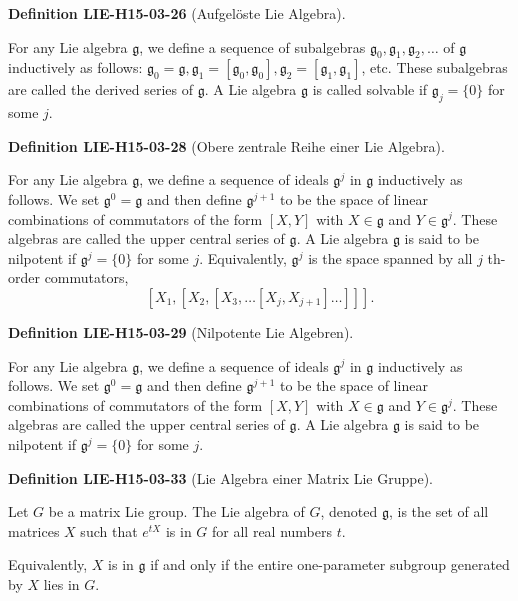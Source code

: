 \documentclass[10pt, letterpaper]{article}
\newcommand{\CustomHeading}[3]{%
  \par\medskip\noindent%
  \textbf{#1 #2} \textnormal{(#3)}.\enskip%
}
\newenvironment{DEF}[2]{\CustomHeading{Definition}{#1}{#2}}{}
\begin{document}
\begin{DEF}{LIE-H15-03-26}{Aufgelöste Lie Algebra}
For any Lie algebra $\mathfrak{g}$, we define a sequence of subalgebras $\mathfrak{g}_{0}, \mathfrak{g}_{1}, \mathfrak{g}_{2}, \ldots$ of $\mathfrak{g}$ inductively as follows: $\mathfrak{g}_{0}=\mathfrak{g}, \mathfrak{g}_{1}=\left[\mathfrak{g}_{0}, \mathfrak{g}_{0}\right], \mathfrak{g}_{2}=\left[\mathfrak{g}_{1}, \mathfrak{g}_{1}\right]$, etc. These subalgebras are called the derived series of $\mathfrak{g}$. A Lie algebra $\mathfrak{g}$ is called solvable if $\mathfrak{g}_{j}=\{0\}$ for some $j$.
\end{DEF}

\begin{DEF}{LIE-H15-03-28}{Obere zentrale Reihe einer Lie Algebra}
For any Lie algebra $\mathfrak{g}$, we define a sequence of ideals $\mathfrak{g}^{j}$ in $\mathfrak{g}$ inductively as follows. We set $\mathfrak{g}^{0}=\mathfrak{g}$ and then define $\mathfrak{g}^{j+1}$ to be the space of linear combinations of commutators of the form $[X, Y]$ with $X \in \mathfrak{g}$ and $Y \in \mathfrak{g}^{j}$. These algebras are called the upper central series of $\mathfrak{g}$. A Lie algebra $\mathfrak{g}$ is said to be nilpotent if $\mathfrak{g}^{j}=\{0\}$ for some $j$.
Equivalently, $\mathfrak{g}^{j}$ is the space spanned by all $j$ th-order commutators,
$$
\left[X_{1},\left[X_{2},\left[X_{3}, \ldots\left[X_{j}, X_{j+1}\right] \ldots\right]\right]\right] .
$$
\end{DEF}

\begin{DEF}{LIE-H15-03-29}{Nilpotente Lie Algebren}
For any Lie algebra $\mathfrak{g}$, we define a sequence of ideals $\mathfrak{g}^{j}$ in $\mathfrak{g}$ inductively as follows. We set $\mathfrak{g}^{0}=\mathfrak{g}$ and then define $\mathfrak{g}^{j+1}$ to be the space of linear combinations of commutators of the form $[X, Y]$ with $X \in \mathfrak{g}$ and $Y \in \mathfrak{g}^{j}$. These algebras are called the upper central series of $\mathfrak{g}$. A Lie algebra $\mathfrak{g}$ is said to be nilpotent if $\mathfrak{g}^{j}=\{0\}$ for some $j$.
\end{DEF}

\begin{DEF}{LIE-H15-03-33}{Lie Algebra einer Matrix Lie Gruppe}
Let $G$ be a matrix Lie group. The Lie algebra of $G$, denoted $\mathfrak{g}$, is the set of all matrices $X$ such that $e^{t X}$ is in $G$ for all real numbers $t$.

Equivalently, $X$ is in $\mathfrak{g}$ if and only if the entire one-parameter subgroup generated by $X$ lies in $G$.
\end{DEF}
\end{document}
